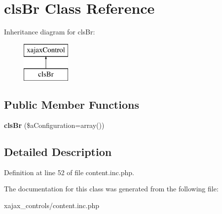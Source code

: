 \hypertarget{classclsBr}{
\section{clsBr Class Reference}
\label{classclsBr}
}
Inheritance diagram for clsBr:\begin{figure}[H]
\begin{center}
\leavevmode
\includegraphics[height=2.000000cm]{classclsBr}
\end{center}
\end{figure}
\subsection*{Public Member Functions}
\begin{DoxyCompactItemize}
\item 
\hypertarget{classclsBr_ac6802a9e1bd34d7e9aa6d31e7e716f37}{
{\bfseries clsBr} (\$aConfiguration=array())}
\label{classclsBr_ac6802a9e1bd34d7e9aa6d31e7e716f37}

\end{DoxyCompactItemize}


\subsection{Detailed Description}


Definition at line 52 of file content.inc.php.



The documentation for this class was generated from the following file:\begin{DoxyCompactItemize}
\item 
xajax\_\-controls/content.inc.php\end{DoxyCompactItemize}
